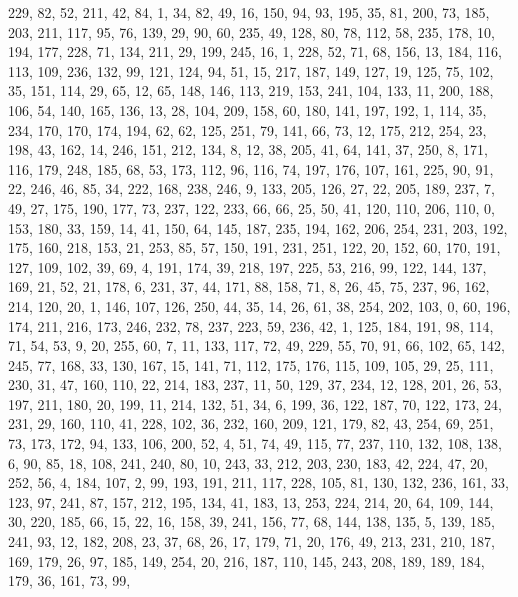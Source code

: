 \begin{DoxyCode}
       229, 82, 52, 211, 42, 84, 1, 34, 82, 49, 16, 150, 94, 93, 195, 35, 81, 200, 73, 185, 203, 211, 117, 95, 76,
       139, 29, 90, 60, 235, 49, 128, 80, 78, 112, 58, 235, 178, 10, 194, 177, 228, 71, 134, 211, 29, 199, 245,
       16, 1, 228, 52, 71, 68, 156, 13, 184, 116, 113, 109, 236, 132, 99, 121, 124, 94, 51, 15, 217, 187, 149, 127,
       19, 125, 75, 102, 35, 151, 114, 29, 65, 12, 65, 148, 146, 113, 219, 153, 241, 104, 133, 11, 200, 188, 106,
       54, 140, 165, 136, 13, 28, 104, 209, 158, 60, 180, 141, 197, 192, 1, 114, 35, 234, 170, 170, 174, 194, 62, 62,
       125, 251, 79, 141, 66, 73, 12, 175, 212, 254, 23, 198, 43, 162, 14, 246, 151, 212, 134, 8, 12, 38, 205, 41,
       64, 141, 37, 250, 8, 171, 116, 179, 248, 185, 68, 53, 173, 112, 96, 116, 74, 197, 176, 107, 161, 225, 90,
       91, 22, 246, 46, 85, 34, 222, 168, 238, 246, 9, 133, 205, 126, 27, 22, 205, 189, 237, 7, 49, 27, 175, 190,
       177, 73, 237, 122, 233, 66, 66, 25, 50, 41, 120, 110, 206, 110, 0, 153, 180, 33, 159, 14, 41, 150, 64, 145,
       187, 235, 194, 162, 206, 254, 231, 203, 192, 175, 160, 218, 153, 21, 253, 85, 57, 150, 191, 231, 251, 122, 20,
       152, 60, 170, 191, 127, 109, 102, 39, 69, 4, 191, 174, 39, 218, 197, 225, 53, 216, 99, 122, 144, 137, 169,
       21, 52, 21, 178, 6, 231, 37, 44, 171, 88, 158, 71, 8, 26, 45, 75, 237, 96, 162, 214, 120, 20, 1, 146, 107,
       126, 250, 44, 35, 14, 26, 61, 38, 254, 202, 103, 0, 60, 196, 174, 211, 216, 173, 246, 232, 78, 237, 223, 59,
       236, 42, 1, 125, 184, 191, 98, 114, 71, 54, 53, 9, 20, 255, 60, 7, 11, 133, 117, 72, 49, 229, 55, 70, 91,
       66, 102, 65, 142, 245, 77, 168, 33, 130, 167, 15, 141, 71, 112, 175, 176, 115, 109, 105, 29, 25, 111, 230, 31,
       47, 160, 110, 22, 214, 183, 237, 11, 50, 129, 37, 234, 12, 128, 201, 26, 53, 197, 211, 180, 20, 199, 11,
       214, 132, 51, 34, 6, 199, 36, 122, 187, 70, 122, 173, 24, 231, 29, 160, 110, 41, 228, 102, 36, 232, 160, 209,
       121, 179, 82, 43, 254, 69, 251, 73, 173, 172, 94, 133, 106, 200, 52, 4, 51, 74, 49, 115, 77, 237, 110, 132,
       108, 138, 6, 90, 85, 18, 108, 241, 240, 80, 10, 243, 33, 212, 203, 230, 183, 42, 224, 47, 20, 252, 56, 4,
       184, 107, 2, 99, 193, 191, 211, 117, 228, 105, 81, 130, 132, 236, 161, 33, 123, 97, 241, 87, 157, 212, 195,
       134, 41, 183, 13, 253, 224, 214, 20, 64, 109, 144, 30, 220, 185, 66, 15, 22, 16, 158, 39, 241, 156, 77, 68,
       144, 138, 135, 5, 139, 185, 241, 93, 12, 182, 208, 23, 37, 68, 26, 17, 179, 71, 20, 176, 49, 213, 231, 210,
       187, 169, 179, 26, 97, 185, 149, 254, 20, 216, 187, 110, 145, 243, 208, 189, 189, 184, 179, 36, 161, 73, 99,

\end{DoxyCode}
